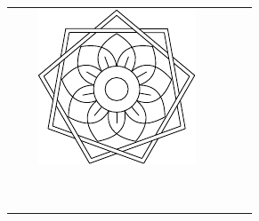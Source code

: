 \documentclass{article}
\begin{document}
\begin{table}
\begin{tabular}{|p{1em}|l|p{1em}|l|p{1em}|l|p{1em}|}
& &
\includegraphics[width=0.25\linewidth]{9/1.pdf} 
&
\tabularnewline
&&&&&& \tabularnewline
&&&&&& \tabularnewline
&&&&&& \tabularnewline
&&&&&& \tabularnewline
&&&&&& \tabularnewline
&&&&&& \tabularnewline
&&&&&& \tabularnewline
&&&&&& \tabularnewline
&&&&&& \tabularnewline
\hline
\hline
\end{tabular}
\end{table}
\end{document}
